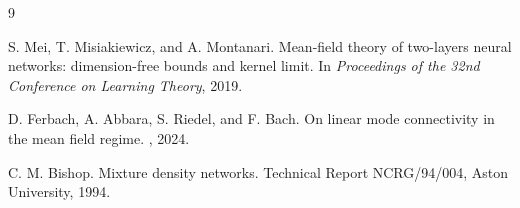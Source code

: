 \documentclass[11pt]{article}
\theoremstyle{definition}
\begin{document}
\begin{thebibliography}{9}

S. Mei, T. Misiakiewicz, and A. Montanari.
\newblock Mean-field theory of two-layers neural networks: dimension-free
  bounds and kernel limit.
\newblock In {\em Proceedings of the 32nd Conference on Learning Theory},
  2019.

D. Ferbach, A. Abbara, S. Riedel, and F. Bach.
\newblock On linear mode connectivity in the mean field regime.
, 2024.

C. M. Bishop.
\newblock Mixture density networks.
\newblock Technical Report NCRG/94/004, Aston University, 1994.

\end{thebibliography}
\end{document}
